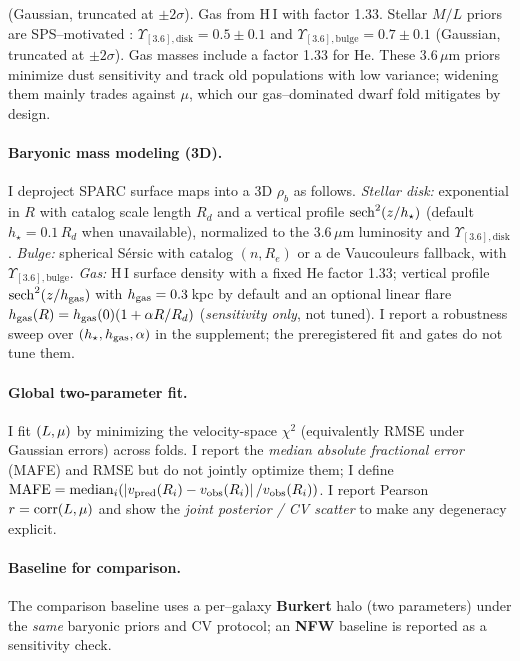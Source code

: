 		(Gaussian, truncated at $\pm 2\sigma$). Gas from H\,I with factor 1.33.
		Stellar $M/L$ priors are SPS–motivated \citep{meidt2014mlr36,schombert2014cmlr}:
		$\Upsilon_{[3.6],\mathrm{disk}}=0.5\pm0.1$ and
		$\Upsilon_{[3.6],\mathrm{bulge}}=0.7\pm0.1$
		(Gaussian, truncated at $\pm2\sigma$). Gas masses include a factor 1.33 for He.
		These 3.6\,$\mu$m priors minimize dust sensitivity and track old populations with low variance;
		widening them mainly trades against $\mu$, which our gas–dominated dwarf fold mitigates by design.
		\paragraph{Baryonic mass modeling (3D).}
		I deproject SPARC surface maps into a 3D $\rho_b$ as follows.
		\emph{Stellar disk:} exponential in $R$ with catalog scale length $R_d$ and a vertical profile
		${\rm sech}^2(z/h_\star)$ (default $h_\star=0.1\,R_d$ when unavailable), normalized to the
		$3.6\,\mu$m luminosity and $\Upsilon_{[3.6],\mathrm{disk}}$.
		\emph{Bulge:} spherical Sérsic with catalog $(n,R_e)$ or a de Vaucouleurs fallback, with
		$\Upsilon_{[3.6],\mathrm{bulge}}$.
		\emph{Gas:} H\,I surface density with a fixed He factor 1.33; vertical profile ${\rm sech}^2(z/h_{\rm gas})$
		with $h_{\rm gas}=0.3$\,kpc by default and an optional linear flare $h_{\rm gas}(R)=h_{\rm gas}(0)(1+\alpha R/R_d)$
		(\emph{sensitivity only}, not tuned).
		I report a robustness sweep over $(h_\star,h_{\rm gas},\alpha)$ in the supplement; the preregistered fit and gates do not tune them.
		
		\paragraph{Global two-parameter fit.}
		I fit $(L,\mu)$ by minimizing the velocity-space $\chi^2$ (equivalently RMSE under Gaussian errors) across folds. I report the \emph{median absolute fractional error} (MAFE) and RMSE but do not jointly optimize them; I define $\mathrm{MAFE}=\operatorname{median}_i\!\left(\left|v_{\rm pred}(R_i)-v_{\rm obs}(R_i)\right|/v_{\rm obs}(R_i)\right)$. I report Pearson $r=\mathrm{corr}(L,\mu)$ and show the \emph{joint posterior / CV scatter} to make any degeneracy explicit.
		
		\paragraph{Baseline for comparison.}
		The comparison baseline uses a per--galaxy \textbf{Burkert} halo (two parameters) under the \emph{same} baryonic priors and CV protocol; an \textbf{NFW} baseline is reported as a sensitivity check.
		
